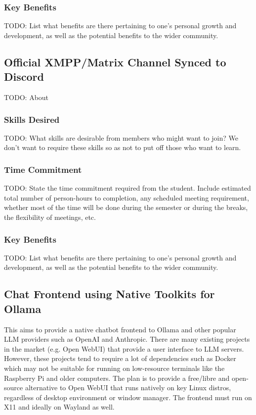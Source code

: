 \documentclass[11pt,fleqn]{article}
\begin{document}
\subsubsection*{Key Benefits}

TODO: List what benefits are there pertaining to one's personal growth and development, as well as the potential benefits to the wider community.

\newpage

\subsection{Official XMPP/Matrix Channel Synced to Discord}

TODO: About

\subsubsection*{Skills Desired}

TODO: What skills are desirable from members who might want to join?  We don't want to require these skills so as not to put off those who want to learn.

\subsubsection*{Time Commitment}

TODO: State the time commitment required from the student.  Include estimated total number of person-hours to completion, any scheduled meeting requirement, whether most of the time will be done during the semester or during the breaks, the flexibility of meetings, etc.

\subsubsection*{Key Benefits}

TODO: List what benefits are there pertaining to one's personal growth and development, as well as the potential benefits to the wider community.

\newpage

\subsection{Chat Frontend using Native Toolkits for Ollama}

This aims to provide a native chatbot frontend to Ollama and other popular LLM providers such as OpenAI and Anthropic.  There are many existing projects in the market (e.g. Open WebUI) that provide a user interface to LLM servers.  However, these projects tend to require a lot of dependencies such as Docker which may not be suitable for running on low-resource terminals like the Raspberry Pi and older computers.  The plan is to provide a free/libre and open-source alternative to Open WebUI that runs natively on key Linux distros, regardless of desktop environment or window manager.  The frontend must run on X11 and ideally on Wayland as well.
\end{document}
